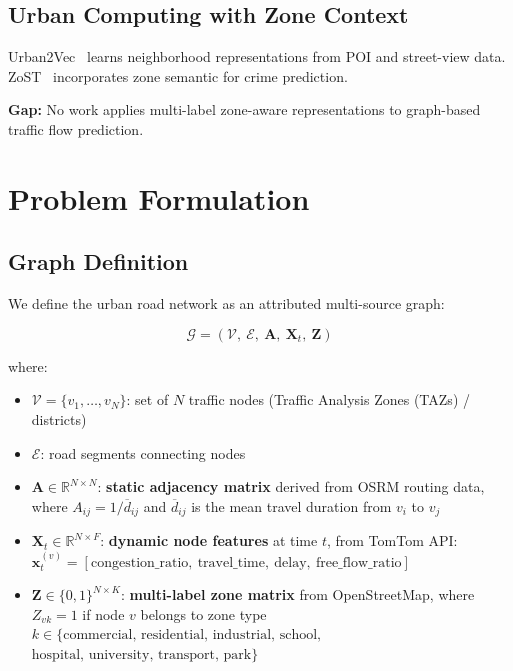 \documentclass[12pt,a4paper]{article}
\begin{document}
\subsection{Urban Computing with Zone Context}
Urban2Vec~\cite{wang2020urban2vec} learns neighborhood representations from
POI and street-view data. ZoST~\cite{} incorporates zone semantic for crime prediction.

\textbf{Gap:} No work applies multi-label zone-aware representations to
graph-based traffic flow prediction.

\section{Problem Formulation}

\subsection{Graph Definition}

We define the urban road network as an attributed multi-source graph:

\begin{equation}
\mathcal{G} = (\mathcal{V},\ \mathcal{E},\ \mathbf{A},\ \mathbf{X}_t,\ \mathbf{Z})
\end{equation}

where:
\begin{itemize}
    \item $\mathcal{V} = \{v_1, \ldots, v_N\}$: set of $N$ traffic nodes
          (Traffic Analysis Zones (TAZs) / districts)
    \item $\mathcal{E}$: road segments connecting nodes
    \item $\mathbf{A} \in \mathbb{R}^{N \times N}$: \textbf{static adjacency matrix}
          derived from OSRM routing data, where
          $A_{ij} = 1/\overline{d}_{ij}$ and $\overline{d}_{ij}$ is the
          mean travel duration from $v_i$ to $v_j$
    \item $\mathbf{X}_t \in \mathbb{R}^{N \times F}$: \textbf{dynamic node features}
          at time $t$, from TomTom API:
          $\mathbf{x}_t^{(v)} = [\text{congestion\_ratio},\ \text{travel\_time},\
          \text{delay},\ \text{free\_flow\_ratio}]$
    \item $\mathbf{Z} \in \{0,1\}^{N \times K}$: \textbf{multi-label zone matrix}
          from OpenStreetMap, where $Z_{vk} = 1$ if node $v$ belongs to zone
          type $k \in \{\text{commercial, residential, industrial, school,}$
          $\text{hospital, university, transport, park}\}$
\end{itemize}
\end{document}
